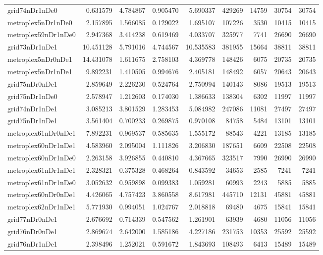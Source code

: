 \begin{longtable}{|l|r|r|r|r|r|r|r|r|}
grid74nDr1nDe0 & 0.631579 & 4.784867 & 0.905470 & 5.690337 & 429269 & 14759 & 30754 & 30754 \\
metroplex5nDr1nDe0 & 2.157895 & 1.566085 & 0.129022 & 1.695107 & 107226 & 3530 & 10415 & 10415 \\
metroplex59nDr1nDe0 & 2.947368 & 3.414238 & 0.619469 & 4.033707 & 325977 & 7741 & 26690 & 26690 \\
grid73nDr1nDe1 & 10.451128 & 5.791016 & 4.744567 & 10.535583 & 381955 & 15664 & 38811 & 38811 \\
metroplex5nDr0nDe1 & 14.431078 & 1.611675 & 2.758103 & 4.369778 & 148426 & 6075 & 20735 & 20735 \\
metroplex5nDr1nDe1 & 9.892231 & 1.410505 & 0.994676 & 2.405181 & 148492 & 6057 & 20643 & 20643 \\
grid75nDr0nDe1 & 2.859649 & 2.226230 & 0.524764 & 2.750994 & 140143 & 8086 & 19513 & 19513 \\
grid75nDr1nDe0 & 2.578947 & 1.212603 & 0.174030 & 1.386633 & 138304 & 6302 & 11997 & 11997 \\
grid74nDr1nDe1 & 3.085213 & 3.801529 & 1.283453 & 5.084982 & 247086 & 11081 & 27497 & 27497 \\
grid75nDr1nDe1 & 3.561404 & 0.700233 & 0.269875 & 0.970108 & 84758 & 5484 & 13101 & 13101 \\
metroplex61nDr0nDe1 & 7.892231 & 0.969537 & 0.585635 & 1.555172 & 88543 & 4221 & 13185 & 13185 \\
metroplex60nDr1nDe1 & 4.583960 & 2.095004 & 1.111826 & 3.206830 & 187651 & 6609 & 22508 & 22508 \\
metroplex60nDr1nDe0 & 2.263158 & 3.926855 & 0.440810 & 4.367665 & 323517 & 7990 & 26990 & 26990 \\
metroplex61nDr1nDe1 & 2.328321 & 0.375328 & 0.468264 & 0.843592 & 34653 & 2585 & 7241 & 7241 \\
metroplex61nDr1nDe0 & 3.052632 & 0.959898 & 0.099383 & 1.059281 & 60993 & 2243 & 5885 & 5885 \\
metroplex60nDr0nDe1 & 4.426065 & 4.757423 & 3.860558 & 8.617981 & 445710 & 12131 & 45881 & 45881 \\
metroplex62nDr1nDe1 & 5.771930 & 0.994051 & 1.024767 & 2.018818 & 69480 & 4675 & 15841 & 15841 \\
grid77nDr0nDe1 & 2.676692 & 0.714339 & 0.547562 & 1.261901 & 63939 & 4680 & 11056 & 11056 \\
grid76nDr0nDe1 & 2.869674 & 2.642000 & 1.585186 & 4.227186 & 231753 & 10353 & 25592 & 25592 \\
grid76nDr1nDe1 & 2.398496 & 1.252021 & 0.591672 & 1.843693 & 108493 & 6413 & 15489 & 15489 \\

\end{longtable}

